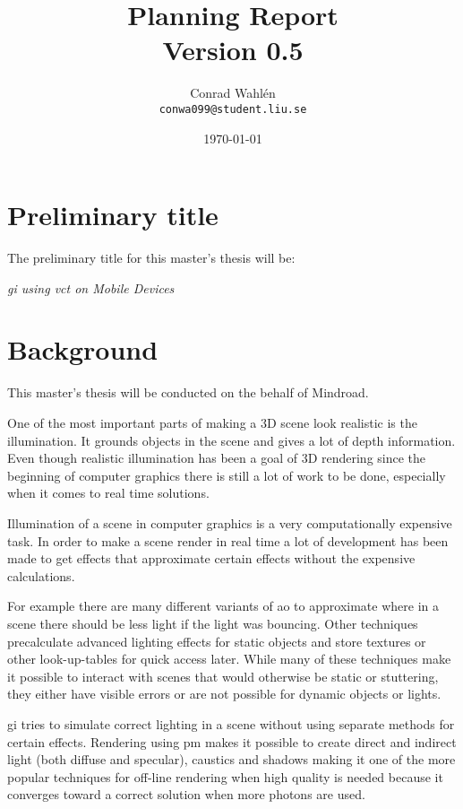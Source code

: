 \documentclass[a4paper, 12pt]{article}
\title{Planning Report \\ \small{Version 0.5}}
\author{Conrad Wahlén \\ \texttt{conwa099@student.liu.se}}
\date{\today}
\begin{document}
\maketitle
\thispagestyle{empty}
\newpage


\section{Preliminary title}
\label{sec:Preliminary title}

The preliminary title for this master's thesis will be:

\textit{\acrlong{gi} using \acrlong{vct} on Mobile Devices}

\section{Background}
\label{sec:Background}

This master's thesis will be conducted on the behalf of Mindroad.

One of the most important parts of making a 3D scene look realistic is the illumination. It grounds objects in the scene and gives a lot of depth information. Even though realistic illumination has been a goal of 3D rendering since the beginning of computer graphics there is still a lot of work to be done, especially when it comes to real time solutions.

Illumination of a scene in computer graphics is a very computationally expensive task. In order to make a scene render in real time a lot of development has been made to get effects that approximate certain effects without the expensive calculations.

For example there are many different variants of \gls{ao} to approximate where in a scene there should be less light if the light was bouncing. Other techniques precalculate advanced lighting effects for static objects and store textures or other look-up-tables for quick access later. While many of these techniques make it possible to interact with scenes that would otherwise be static or stuttering, they either have visible errors or are not possible for dynamic objects or lights.

\gls{gi} tries to simulate correct lighting in a scene without using separate methods for certain effects. Rendering using \gls{pm} makes it possible to create direct and indirect light (both diffuse and specular), caustics and shadows making it one of the more popular techniques for off-line rendering when high quality is needed because it converges toward a correct solution when more photons are used.
\end{document}
